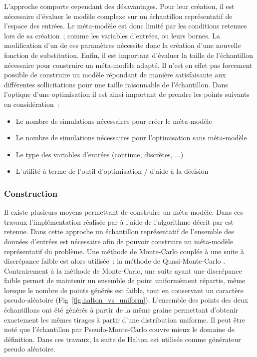 L’approche comporte cependant des désavantages. Pour leur création, il est nécessaire
d’évaluer le modèle complexe sur un échantillon représentatif de l’espace des entrées.
Le méta-modèle est donc limité par les conditions retenues lors de sa création~; comme
les variables d’entrées, ou leurs bornes. La modification d’un de ces paramètres nécessite
donc la création d’une nouvelle fonction de substitution.
Enfin, il est important d’évaluer la taille de l’échantillon nécessaire pour construire
un méta-modèle adapté. Il n’est en effet pas forcement possible de construire un modèle
répondant de manière satisfaisante aux différentes sollicitations pour une taille raisonnable
de l’échantillon.
Dans l’optique d’une optimisation il est ainsi important de prendre les points
suivants en considération~:
\begin{itemize}
  \item Le nombre de simulations nécessaires pour créer le méta-modèle
  \item Le nombre de simulations nécessaires pour l’optimisation sans méta-modèle
  \item Le type des variables d’entrées (continue, discrètes, ...)
  \item L’utilité à terme de l’outil d’optimisation / d’aide à la décision
\end{itemize}


\subsubsection{Construction} %
\label{ssub:construction}
Il existe plusieurs moyens permettant de construire un méta-modèle. Dans ces travaux
l’implémentation réalisée par \textcite{Rania2013} à l’aide de l’algorithme décrit par \textcite{Malen2009}
est retenue.
Dans cette approche un échantillon représentatif de l’ensemble des données d’entrées est
nécessaire afin de pouvoir construire un méta-modèle représentatif du problème. Une
méthode de Monte-Carlo couplée à une suite à discrépance faible est alors utilisée~: la
méthode de Quasi-Monte-Carlo \parencite{Caflisch19981}. Contrairement à la méthode de
Monte-Carlo, une suite ayant une discrépance faible permet de maintenir un ensemble de
point uniformément répartis, même lorsque le nombre de points générés est faible, tout en
conservant un caractère pseudo-aléatoire (Fig~\ref{fig:halton_vs_uniform}). L’ensemble des
points des deux échantillons ont été générés à partir de la même graine permettant
d’obtenir exactement les mêmes tirages à partir d’une distribution uniforme. Il peut être
noté que l’échantillon par Pseudo-Monte-Carlo couvre mieux le domaine de définition. Dans
ces travaux, la suite de Halton est utilisée comme générateur pseudo aléatoire.


